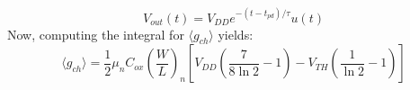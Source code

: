 			\begin{equation}
				V_{out}(t) = V_{DD}e^{-(t-t_{pd})/\tau}u(t)
			\end{equation}
			Now, computing the integral for $\langle g_{ch} \rangle$ yields:
			\begin{equation}
				\langle g_{ch} \rangle = \frac{1}{2}\mu_nC_{ox}\left(\frac{W}{L}\right)_n\left[V_{DD}\left(\frac{7}{8\ln2}-1\right)-V_{TH}\left(\frac{1}{\ln2}-1\right) \right]
			\end{equation}
		

